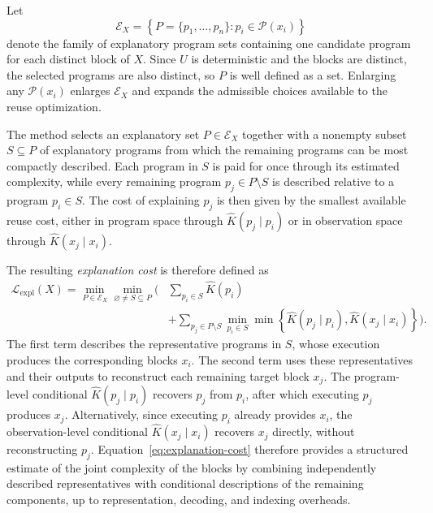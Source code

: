 \documentclass{article}
\begin{document}
Let
\[
\mathcal{E}_X
=
\left\{
P=\{p_1,\ldots,p_n\}
:
p_i\in\mathcal{P}(x_i)
\right\}
\]
denote the family of explanatory program sets containing one candidate program for each distinct block of \(X\). Since \(U\) is deterministic and the blocks are distinct, the selected programs are also distinct, so \(P\) is well defined as a set. Enlarging any \(\mathcal{P}(x_i)\) enlarges \(\mathcal{E}_X\) and expands the admissible choices available to the reuse optimization.

The method selects an explanatory set \(P\in\mathcal{E}_X\) together with a nonempty subset \(S\subseteq P\) of explanatory programs from which the remaining programs can be most compactly described. Each program in \(S\) is paid for once through its estimated complexity, while every remaining program \(p_j\in P\setminus S\) is described relative to a program \(p_i\in S\). The cost of explaining \(p_j\) is then given by the smallest available reuse cost, either in program space through \(\hat K(p_j\mid p_i)\) or in observation space through \(\hat K(x_j\mid x_i)\).

The resulting \emph{explanation cost} is therefore defined as
\begin{equation}
\label{eq:explanation-cost}
\begin{aligned}
\mathcal{L}_{\mathrm{expl}}(X)
=
\min_{P\in\mathcal{E}_X}
\min_{\varnothing\neq S\subseteq P}
\Bigg(
&\sum_{p_i\in S} \hat K(p_i) \\
&+
\sum_{p_j\in P\setminus S}
\min_{p_i\in S}
\min\left\{
\hat K(p_j\mid p_i),
\hat K(x_j\mid x_i)
\right\}
\Bigg).
\end{aligned}
\end{equation}
The first term describes the representative programs in \(S\), whose execution produces the corresponding blocks \(x_i\). The second term uses these representatives and their outputs to reconstruct each remaining target block \(x_j\). The program-level conditional \(\hat K(p_j\mid p_i)\) recovers \(p_j\) from \(p_i\), after which executing \(p_j\) produces \(x_j\). Alternatively, since executing \(p_i\) already provides \(x_i\), the observation-level conditional \(\hat K(x_j\mid x_i)\) recovers \(x_j\) directly, without reconstructing \(p_j\). Equation~\eqref{eq:explanation-cost} therefore provides a structured estimate of the joint complexity of the blocks by combining independently described representatives with conditional descriptions of the remaining components, up to representation, decoding, and indexing overheads.
\end{document}
